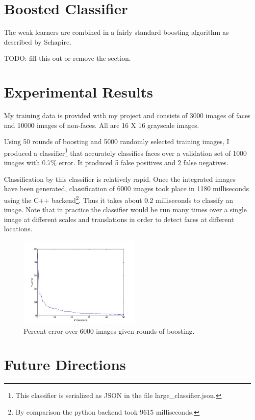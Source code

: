 \documentclass[11pt,twocolumn]{article}
\begin{document}
\section{Boosted Classifier}
\label{sec:boosting}

The weak learners are combined in a fairly standard boosting algorithm
as described by Schapire\cite{schapire2001}.

TODO: fill this out or remove the section.

\section{Experimental Results}

My training data\cite{trainingdata} is provided with my project and consists of 3000
images of faces and 10000 images of non-faces. All are 16 X 16
grayscale images.

Using 50 rounds of boosting and 5000 randomly selected training
images, I produced a classifier\footnote{This classifier is serialized
  as JSON in the file large\_classifier.json.}  that accurately
classifies faces over a validation set of 1000 images with 0.7\%
error. It produced 5 false positives and 2 false negatives.

Classification by this classifier is relatively rapid. Once the
integrated images have been generated, classification of 6000 images
took place in 1180 milliseconds using the C++ backend\footnote{By
  comparison the python backend took 9615 milliseconds.}. Thus it
takes about 0.2 milliseconds to classify an image. Note that in
practice the classifier would be run many times over a single image at
different scales and translations in order to detect faces at
different locations.

\begin{figure}
\includegraphics[width=60mm]{pct_err.png}
\caption{Percent error over 6000 images given rounds of boosting.}
\label{fig:bootingiter}
\end{figure}


\section{Future Directions}
\end{document}
